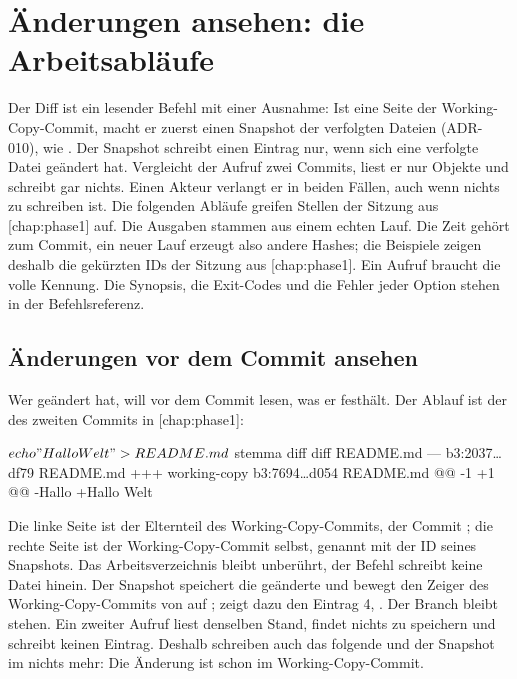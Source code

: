 \section[sec:diff-workflows]{Änderungen ansehen: die Arbeitsabläufe}

Der Diff ist ein lesender Befehl mit einer Ausnahme: Ist eine Seite der Working-Copy-Commit,
macht er zuerst einen Snapshot der verfolgten Dateien (ADR-010), wie .
Der Snapshot schreibt einen Eintrag nur, wenn sich eine verfolgte Datei geändert hat.
Vergleicht der Aufruf zwei Commits, liest er nur Objekte und schreibt gar nichts.
Einen Akteur verlangt er in beiden Fällen, auch wenn nichts zu schreiben ist.
Die folgenden Abläufe greifen Stellen der Sitzung aus [chap:phase1] auf.
Die Ausgaben stammen aus einem echten Lauf. Die Zeit gehört zum Commit, ein neuer Lauf
erzeugt also andere Hashes; die Beispiele zeigen deshalb die gekürzten IDs der Sitzung aus
[chap:phase1]. Ein Aufruf braucht die volle Kennung.
Die Synopsis, die Exit-Codes und die Fehler jeder Option stehen in der Befehlsreferenz.

\subsection{Änderungen vor dem Commit ansehen}

Wer  geändert hat, will vor dem Commit lesen, was er festhält.
Der Ablauf ist der des zweiten Commits in [chap:phase1]:

\starttyping
$ echo "Hallo Welt" > README.md
$ stemma diff
diff README.md
--- b3:2037…df79 README.md
+++ working-copy b3:7694…d054 README.md
@@ -1 +1 @@
-Hallo
+Hallo Welt
\stoptyping

Die linke Seite ist der Elternteil des Working-Copy-Commits, der Commit ;
die rechte Seite ist der Working-Copy-Commit selbst, genannt mit der ID seines Snapshots.
Das Arbeitsverzeichnis bleibt unberührt, der Befehl schreibt keine Datei hinein.
Der Snapshot speichert die geänderte  und bewegt den Zeiger des
Working-Copy-Commits von  auf ;  zeigt dazu den
Eintrag 4, . Der Branch  bleibt stehen.
Ein zweiter Aufruf liest denselben Stand, findet nichts zu speichern und schreibt keinen Eintrag.
Deshalb schreiben auch das folgende  und der Snapshot im 
nichts mehr: Die Änderung ist schon im Working-Copy-Commit.


